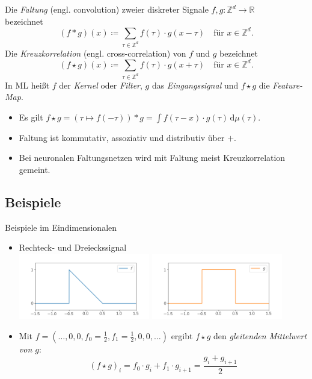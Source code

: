 \documentclass[envcountsect, smaller, aspectratio=149]{beamer}
\newcommand{\diff}{\,\textrm{d}}
\newcommand{\R}{\mathbb{R}}
\newcommand{\Z}{\mathbb{Z}}
\begin{document}
\begin{frame}[t]
    \begin{definition}
        Die \emph{Faltung} (engl. \foreignlanguage{english}{convolution}) zweier diskreter Signale $f,g: \Z^d \rightarrow \R$ \\
        bezeichnet
        \[
          (f*g) (x) \coloneqq \sum_{\tau\in \Z^d} f(\tau) \cdot g(x-\tau) \quad\text{für $x\in \Z^d$}.
        \]%
        Die \emph{Kreuzkorrelation} (engl. \foreignlanguage{english}{cross-correlation}) von $f$ und $g$ bezeichnet
        \[
            (f\star g) (x) \coloneqq \sum_{\tau\in \Z^d} f(\tau) \cdot g(x+\tau) \quad\text{für $x\in \Z^d$}.
        \]
        In ML heißt $f$ der \emph{Kernel} oder \emph{Filter}, $g$ das \emph{Eingangssignal} 
        und $f\star g$ die \emph{Feature-Map}.
    \end{definition}
    \begin{itemize}
        \pause\item Es gilt $f\star g= (\tau\mapsto f(-\tau)) * g = \int f(\tau - x) \cdot g(\tau) \diff \mu(\tau)$.
        \pause\item Faltung ist kommutativ, assoziativ und distributiv über $+$.
        \pause\item Bei neuronalen Faltungsnetzen wird mit Faltung meist Kreuzkorrelation gemeint.
    \end{itemize}
\end{frame}

\subsection{Beispiele}

\begin{frame}{Beispiele im Eindimensionalen}
    \begin{itemize}
        \item Rechteck- und Dreieckssignal\\
        {
        \centering
        \includegraphics[width=0.45\textwidth]{../f.png}
        \includegraphics[width=0.45\textwidth]{../g.png}
        }
        \pause
        \item Mit $f = (\dots, 0, 0, f_0 = \frac{1}{2}, f_1 = \frac{1}{2}, 0, 0, \dots)$ ergibt 
        $f \star g$
        den \emph{gleitenden Mittelwert von $g$}: \[(f\star g)_i = f_0 \cdot g_i + f_1 \cdot g_{i + 1} = \frac{g_i + g_{i+1}}{2}\]
    \end{itemize}
\end{frame}
\end{document}
